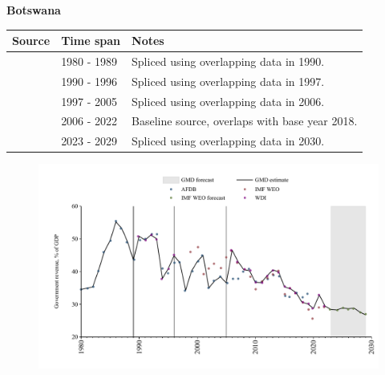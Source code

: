 \documentclass[12pt,a4paper,landscape]{article}
\begin{document}
\begin{adjustbox}{max totalsize={\paperwidth}{\paperheight},center}
\begin{minipage}[t][\textheight][t]{\textwidth}
\vspace*{0.5cm}
{}
\begin{center}
{\Large\bfseries Botswana}
\end{center}
\vspace{0.5cm}
\begin{table}[H]
\centering
\small
\begin{tabular}{|l|l|l|}
\hline
\textbf{Source} & \textbf{Time span} & \textbf{Notes} \\
\hline
\rowcolor{white}\cite{AFDB}& 1980 - 1989 &Spliced using overlapping data in 1990.\\
\rowcolor{lightgray}\cite{WDI}& 1990 - 1996 &Spliced using overlapping data in 1997.\\
\rowcolor{white}\cite{AFDB}& 1997 - 2005 &Spliced using overlapping data in 2006.\\
\rowcolor{lightgray}\cite{WDI}& 2006 - 2022 &Baseline source, overlaps with base year 2018.\\
\rowcolor{white}\cite{IMF_WEO_forecast}& 2023 - 2029 &Spliced using overlapping data in 2030.\\
\hline
\end{tabular}
\end{table}
\begin{figure}[H]
\centering
\includegraphics[width=\textwidth,height=0.6\textheight,keepaspectratio]{graphs/BWA_govrev_GDP.pdf}
\end{figure}
\end{minipage}
\end{adjustbox}
\end{document}

